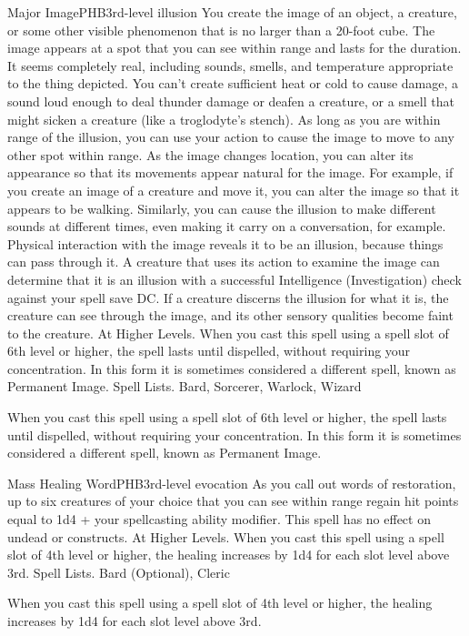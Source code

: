 \begin{spell}{Major Image}{PHB}{3rd-level illusion}
{
}
You create the image of an object, a creature, or some other visible phenomenon that is no larger than a 20-foot cube. The image appears at a spot that you can see within range and lasts for the duration. It seems completely real, including sounds, smells, and temperature appropriate to the thing depicted. You can’t create sufficient heat or cold to cause damage, a sound loud enough to deal thunder damage or deafen a creature, or a smell that might sicken a creature (like a troglodyte’s stench).
As long as you are within range of the illusion, you can use your action to cause the image to move to any other spot within range. As the image changes location, you can alter its appearance so that its movements appear natural for the image. For example, if you create an image of a creature and move it, you can alter the image so that it appears to be walking. Similarly, you can cause the illusion to make different sounds at different times, even making it carry on a conversation, for example.
Physical interaction with the image reveals it to be an illusion, because things can pass through it. A creature that uses its action to examine the image can determine that it is an illusion with a successful Intelligence (Investigation) check against your spell save DC. If a creature discerns the illusion for what it is, the creature can see through the image, and its other sensory qualities become faint to the creature.
At Higher Levels. When you cast this spell using a spell slot of 6th level or higher, the spell lasts until dispelled, without requiring your concentration. In this form it is sometimes considered a different spell, known as Permanent Image.
Spell Lists. Bard, Sorcerer, Warlock, Wizard

 When you cast this spell using a spell slot of 6th level or higher, the spell lasts until dispelled, without requiring your concentration. In this form it is sometimes considered a different spell, known as Permanent Image.
\end{spell}

\begin{spell}{Mass Healing Word}{PHB}{3rd-level evocation}
{
}
As you call out words of restoration, up to six creatures of your choice that you can see within range regain hit points equal to 1d4 + your spellcasting ability modifier. This spell has no effect on undead or constructs.
At Higher Levels. When you cast this spell using a spell slot of 4th level or higher, the healing increases by 1d4 for each slot level above 3rd.
Spell Lists. Bard (Optional), Cleric

 When you cast this spell using a spell slot of 4th level or higher, the healing increases by 1d4 for each slot level above 3rd.
\end{spell}

